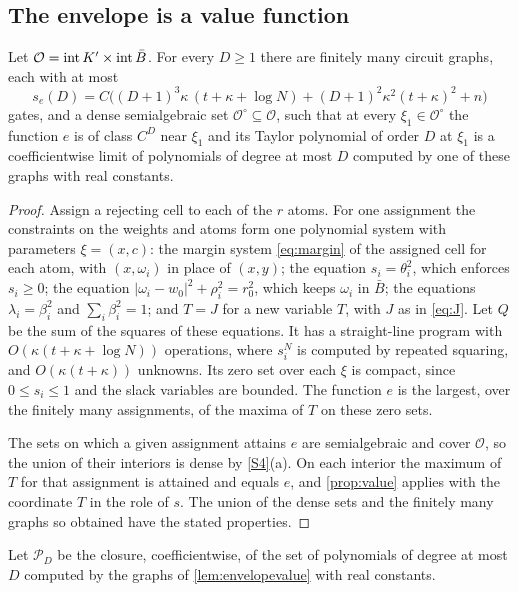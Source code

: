 \subsection{The envelope is a value function}

\begin{lemma}\label{lem:envelopevalue}
Let $\mathcal O=\operatorname{int} K'\times\operatorname{int}\bar B$. For every $D\ge1$ there are finitely many circuit graphs, each with at most
\[
s_e(D)=C\bigl((D+1)^3\kappa\,(t+\kappa+\log N)+(D+1)^2\kappa^2(t+\kappa)^2+n\bigr)
\]
gates, and a dense semialgebraic set $\mathcal O^\circ\subseteq\mathcal O$, such that at every $\xi_1\in\mathcal O^\circ$ the function $e$ is of class $C^D$ near $\xi_1$ and its Taylor polynomial of order $D$ at $\xi_1$ is a coefficientwise limit of polynomials of degree at most $D$ computed by one of these graphs with real constants.
\end{lemma}

\begin{proof}
Assign a rejecting cell to each of the $r$ atoms. For one assignment the constraints on the weights and atoms form one polynomial system with parameters $\xi=(x,c)$: the margin system \eqref{eq:margin} of the assigned cell for each atom, with $(x,\omega_i)$ in place of $(x,y)$; the equation $s_i=\theta_i^2$, which enforces $s_i\ge0$; the equation $|\omega_i-w_0|^2+\rho_i^2=r_0^2$, which keeps $\omega_i$ in $\bar B$; the equations $\lambda_i=\beta_i^2$ and $\sum_i\beta_i^2=1$; and $T=J$ for a new variable $T$, with $J$ as in \eqref{eq:J}. Let $Q$ be the sum of the squares of these equations. It has a straight-line program with $O(\kappa(t+\kappa+\log N))$ operations, where $s_i^N$ is computed by repeated squaring, and $O(\kappa(t+\kappa))$ unknowns. Its zero set over each $\xi$ is compact, since $0\le s_i\le1$ and the slack variables are bounded. The function $e$ is the largest, over the finitely many assignments, of the maxima of $T$ on these zero sets.

The sets on which a given assignment attains $e$ are semialgebraic and cover $\mathcal O$, so the union of their interiors is dense by \ref{S4}(a). On each interior the maximum of $T$ for that assignment is attained and equals $e$, and \cref{prop:value} applies with the coordinate $T$ in the role of $s$. The union of the dense sets and the finitely many graphs so obtained have the stated properties.
\end{proof}

Let $\mathcal P_D$ be the closure, coefficientwise, of the set of polynomials of degree at most $D$ computed by the graphs of \cref{lem:envelopevalue} with real constants.

